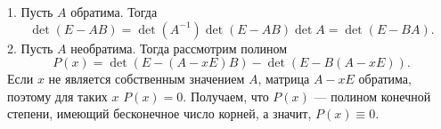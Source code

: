 \documentclass{article}
\begin{document}
1. Пусть $A$ обратима. Тогда $$\det (E-AB) = \det (A^{-1}) \det (E-AB) \det A = \det(E - BA).$$
2. Пусть $A$ необратима. Тогда рассмотрим полином
$$P(x) = \det (E - (A - xE)B) - \det(E - B(A - xE)).$$ Если $x$ не является собственным значением $A$, матрица $A-xE$ обратима, поэтому для таких $x$ $P(x) = 0$. Получаем, что $P(x)$ --- полином конечной степени, имеющий бесконечное число корней, а значит, $P(x) \equiv 0$.
\end{document}
